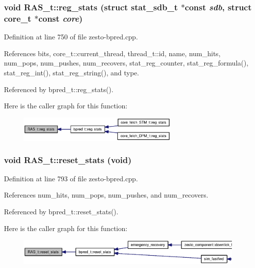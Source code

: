 \subsubsection[{reg\_\-stats}]{\setlength{\rightskip}{0pt plus 5cm}void RAS\_\-t::reg\_\-stats (struct {\bf stat\_\-sdb\_\-t} $\ast$const  {\em sdb}, \/  struct {\bf core\_\-t} $\ast$const  {\em core})\hspace{0.3cm}{\tt  [virtual]}}\label{classRAS__t_3f45ebc7d9e077724a823563c72d2fd6}




Definition at line 750 of file zesto-bpred.cpp.

References bits, core\_\-t::current\_\-thread, thread\_\-t::id, name, num\_\-hits, num\_\-pops, num\_\-pushes, num\_\-recovers, stat\_\-reg\_\-counter, stat\_\-reg\_\-formula(), stat\_\-reg\_\-int(), stat\_\-reg\_\-string(), and type.

Referenced by bpred\_\-t::reg\_\-stats().

Here is the caller graph for this function:\nopagebreak
\begin{figure}[H]
\begin{center}
\leavevmode
\includegraphics[width=224pt]{classRAS__t_3f45ebc7d9e077724a823563c72d2fd6_icgraph}
\end{center}
\end{figure}
\subsubsection[{reset\_\-stats}]{\setlength{\rightskip}{0pt plus 5cm}void RAS\_\-t::reset\_\-stats (void)\hspace{0.3cm}{\tt  [virtual]}}\label{classRAS__t_e24714df216c2694c75ef8d7f872ed35}




Definition at line 793 of file zesto-bpred.cpp.

References num\_\-hits, num\_\-pops, num\_\-pushes, and num\_\-recovers.

Referenced by bpred\_\-t::reset\_\-stats().

Here is the caller graph for this function:\nopagebreak
\begin{figure}[H]
\begin{center}
\leavevmode
\includegraphics[width=420pt]{classRAS__t_e24714df216c2694c75ef8d7f872ed35_icgraph}
\end{center}
\end{figure}
